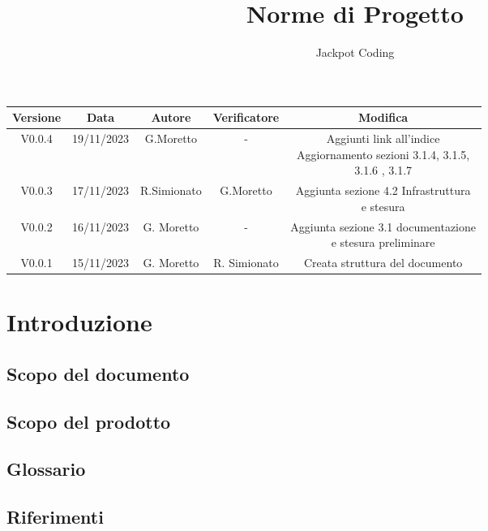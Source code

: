 \documentclass{article}
\title{Norme di Progetto}
\author{Jackpot Coding}
\begin{document}
\maketitle

\pagebreak

\begin{table}[ht]
  \begin{tabular}{|c|c|c|c|c|}
    \hline
    \textbf{Versione} & \textbf{Data} & \textbf{Autore} & \textbf{Verificatore} & \textbf{Modifica} \\
    \hline
    V0.0.4 & 19/11/2023 & G.Moretto & - & \shortstack{Aggiunti link all'indice \\ Aggiornamento sezioni 3.1.4, 3.1.5,\\ 3.1.6 , 3.1.7} \\
    \hline
    V0.0.3 & 17/11/2023 & R.Simionato & G.Moretto & \shortstack{Aggiunta sezione 4.2 Infrastruttura \\ e stesura} \\
    \hline
    V0.0.2 & 16/11/2023 & G. Moretto & - & \shortstack{Aggiunta sezione 3.1 documentazione \\ e stesura preliminare} \\
    \hline
    V0.0.1 & 15/11/2023 & G. Moretto & R. Simionato & Creata struttura del documento \\
    \hline
  \end{tabular}
  \label{tab:conference}
\end{table}


\pagebreak
\tableofcontents
\pagebreak

\section{Introduzione}

\subsection{Scopo del documento}
\subsection{Scopo del prodotto}
\subsection{Glossario}
\subsection{Riferimenti}
\end{document}
